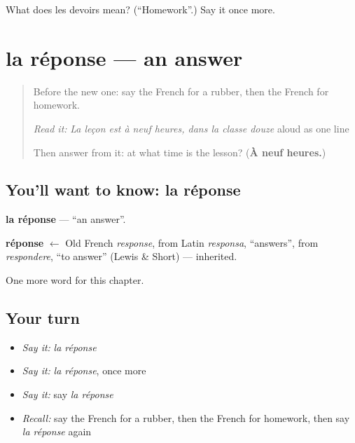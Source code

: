 \begin{tcolorbox}[breakable,colback=teal!4,colframe=teal!35!black,title={Before you move on}]
What does les devoirs mean? (\textquotedblleft{}Homework\textquotedblright{}.) Say it once more.
\end{tcolorbox}
\section[la réponse]{la réponse — an answer}

\label{lesson:FR-C127-reponse}



\begin{quote}
Before the new one: say the French for a rubber, then the French for homework.

\emph{Read it:} \emph{La leçon est à neuf heures, dans la classe douze} aloud as one line

Then answer from it: at what time is the lesson? (\textbf{À neuf heures.})
\end{quote}

\subsection*{You'll want to know: la réponse}
\textbf{la réponse} — \textquotedblleft{}an answer\textquotedblright{}.

\begin{cousinweb}
\textbf{réponse} $\leftarrow$ Old French \emph{response}, from Latin \emph{responsa}, \textquotedblleft{}answers\textquotedblright{}, from \emph{respondere}, \textquotedblleft{}to answer\textquotedblright{} (Lewis \& Short) — inherited.
\end{cousinweb}

\begin{grammarlens}[title={What you've built}]
One more word for this chapter.
\end{grammarlens}

\subsection*{Your turn}
\begin{itemize}
\raggedright
  \item \emph{Say it:} \emph{la réponse}
  \item \emph{Say it:} \emph{la réponse}, once more
  \item \emph{Say it:} say \emph{la réponse}
  \item \emph{Recall:} say the French for a rubber, then the French for homework, then say \emph{la réponse} again
\end{itemize}

